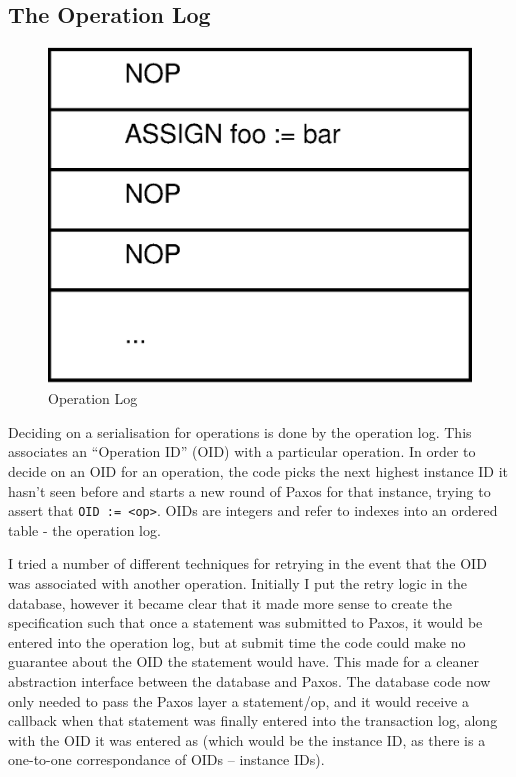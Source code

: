 \documentclass[12pt,twoside,notitlepage]{report}
\begin{document}
\subsection{The Operation Log}

\begin{figure}[htb]
\centering
\includegraphics[scale=0.5]{figs/op-log.eps}
\caption{\label{fig:op-log}Operation Log}
\end{figure}

Deciding on a serialisation for operations is done by the operation log. This associates an
``Operation ID'' (OID) with a particular operation. In order to decide on an OID for an operation,
the code picks the next highest instance ID it hasn't seen before and starts a new round of Paxos
for that instance, trying to assert that \verb$OID := <op>$. OIDs are integers and refer to
indexes into an ordered table - the operation log.

I tried a number of different techniques for retrying in the event that the OID was associated
with another operation. Initially I put the retry logic in the database, however it became clear
that it made more sense to create the specification such that once a statement was submitted to
Paxos, it would be entered into the operation log, but at submit time the code could make no
guarantee about the OID the statement would have. This made for a cleaner abstraction interface
between the database and Paxos. The database code now only needed to pass the Paxos layer a
statement/op, and it would receive a callback when that statement was finally entered into the
transaction log, along with the OID it was entered as (which would be the instance ID, as there is
a one-to-one correspondance of OIDs -- instance IDs).
\end{document}
